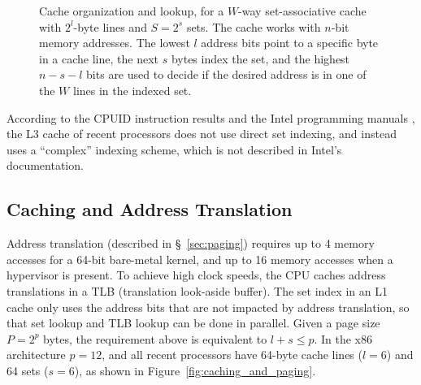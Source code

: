 \begin{figure}[hbt]
  \caption{
    Cache organization and lookup, for a $W$-way set-associative cache with
    $2^{l}$-byte lines and $S = 2^{s}$ sets. The cache works with $n$-bit
    memory addresses. The lowest $l$ address bits point to a specific byte in a
    cache line, the next $s$ bytes index the set, and the highest $n - s - l$
    bits are used to decide if the desired address is in one of the $W$ lines
    in the indexed set.
  }
  \label{fig:cpu_cache}
\end{figure}

According to the CPUID instruction results and the Intel programming manuals
\cite{intel2013manual}, the L3 cache of recent processors does not use direct
set indexing, and instead uses a ``complex'' indexing scheme, which is not
described in Intel's documentation.


\subsection{Caching and Address Translation}

Address translation (described in \S~\ref{sec:paging}) requires up to 4 memory
accesses for a 64-bit bare-metal kernel, and up to 16 memory accesses when a
hypervisor is present. To achieve high clock speeds, the CPU caches address
translations in a TLB (translation look-aside buffer). The set index in an L1
cache only uses the address bits that are not impacted by address translation,
so that set lookup and TLB lookup can be done in parallel. Given a page size
$P = 2^{p}$ bytes, the requirement above is equivalent to $l + s \le p$. In the
x86 architecture $p = 12$, and all recent processors have 64-byte cache lines
($l = 6$) and 64 sets ($s = 6$), as shown in
Figure~\ref{fig:caching_and_paging}.


